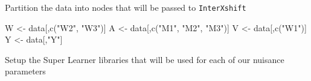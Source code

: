 \documentclass[
]{article}
\newenvironment{Shaded}{\begin{snugshade}}{\end{snugshade}}
\newcommand{\FunctionTok}[1]{\textcolor[rgb]{0.00,0.00,0.00}{#1}}
\newcommand{\NormalTok}[1]{#1}
\newcommand{\OtherTok}[1]{\textcolor[rgb]{0.56,0.35,0.01}{#1}}
\newcommand{\SpecialCharTok}[1]{\textcolor[rgb]{0.00,0.00,0.00}{#1}}
\newcommand{\StringTok}[1]{\textcolor[rgb]{0.31,0.60,0.02}{#1}}
\begin{document}
\begin{Shaded}
\end{Shaded}

Partition the data into nodes that will be passed to \texttt{InterXshift}

\begin{Shaded}
\begin{Highlighting}[]

\NormalTok{W }\OtherTok{\textless{}{-}}\NormalTok{ data[,}\FunctionTok{c}\NormalTok{(}\StringTok{"W2"}\NormalTok{, }\StringTok{"W3"}\NormalTok{)]}
\NormalTok{A }\OtherTok{\textless{}{-}}\NormalTok{ data[,}\FunctionTok{c}\NormalTok{(}\StringTok{"M1"}\NormalTok{, }\StringTok{"M2"}\NormalTok{, }\StringTok{"M3"}\NormalTok{)]}
\NormalTok{V }\OtherTok{\textless{}{-}}\NormalTok{ data[,}\FunctionTok{c}\NormalTok{(}\StringTok{"W1"}\NormalTok{)]}
\NormalTok{Y }\OtherTok{\textless{}{-}}\NormalTok{ data[,}\StringTok{"Y"}\NormalTok{]}
\end{Highlighting}
\end{Shaded}

Setup the Super Learner libraries that will be used for each of our
nuisance parameters
\end{document}
